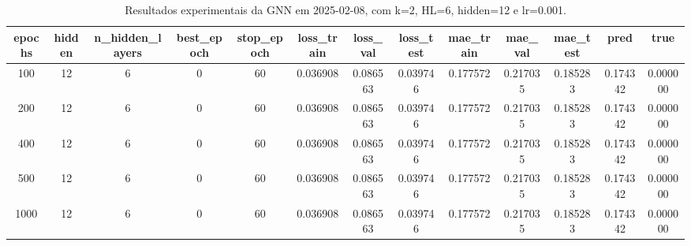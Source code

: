 \begin{table}[h]
\centering
\caption{Resultados experimentais da GNN em 2025-02-08, com k=2, HL=6, hidden=12 e lr=0.001.}
\label{tab:gnn_results_k2_hl6_h12_d20250208}
\begin{tabular}{ccccccccccccc}
\toprule
epochs & hidden & n\_hidden\_layers & best\_epoch & stop\_epoch & loss\_train & loss\_val & loss\_test & mae\_train & mae\_val & mae\_test & pred & true \\
\midrule
100 & 12 & 6 & 0 & 60 & 0.036908 & 0.086563 & 0.039746 & 0.177572 & 0.217035 & 0.185283 & 0.174342 & 0.000000 \\
200 & 12 & 6 & 0 & 60 & 0.036908 & 0.086563 & 0.039746 & 0.177572 & 0.217035 & 0.185283 & 0.174342 & 0.000000 \\
400 & 12 & 6 & 0 & 60 & 0.036908 & 0.086563 & 0.039746 & 0.177572 & 0.217035 & 0.185283 & 0.174342 & 0.000000 \\
500 & 12 & 6 & 0 & 60 & 0.036908 & 0.086563 & 0.039746 & 0.177572 & 0.217035 & 0.185283 & 0.174342 & 0.000000 \\
1000 & 12 & 6 & 0 & 60 & 0.036908 & 0.086563 & 0.039746 & 0.177572 & 0.217035 & 0.185283 & 0.174342 & 0.000000 \\
\bottomrule
\end{tabular}
\end{table}
